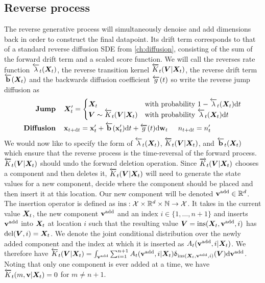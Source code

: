 \subsection{Reverse process}
The reverse generative process will simultaneously denoise and add dimensions back in order to construct the final datapoint. Its drift term corresponds to that of a standard reverse diffusion SDE from \cref{ch:diffusion}, consisting of the sum of the forward drift term and a scaled score function. We will call the reverses rate function $\overleftarrow{\lambda}_t({\bm{X}}_t)$, the reverse transition kernel $\overleftarrow{K}_t({\bm{V}} | {\bm{X}}_t)$, the reverse drift term $\overleftarrow{\mathbf{b}}({\bm{X}}_t)$ and the backwards diffusion coefficient $\overleftarrow{g}(t)$ so write the reverse jump diffusion as
\begin{align}
    \label{eq:tddm-reverse-jump}
    \textbf{Jump} \hspace{.4cm} & {\bm{X}}_t' = \begin{cases}
        {\bm{X}}_t & \text{with probability } 1 - \overleftarrow{\lambda}_t({\bm{X}}_t) \mathrm{d} t \\
        {\bm{V}} \sim \overleftarrow{K}_t( {\bm{V}} |{\bm{X}}_t) & \text{with probability } \overleftarrow{\lambda}_t({\bm{X}}_t) \mathrm{d} t
    \end{cases} 
    \\
    \label{eq:tddm-reverse-diffusion}
    \textbf{Diffusion} \hspace{.4cm} &{\mathbf{x}}_{t+ \mathrm{d} t} = {\mathbf{x}}'_t + \overleftarrow{\mathbf{b}}({\mathbf{x}}'_t)
    \mathrm{d} t + \overleftarrow{g}(t) \mathrm{d} \mathbf{w}_t \hspace{.5cm} n_{t+\mathrm{d} t} = n_t'
\end{align}
We would now like to specify the form of $\overleftarrow{\lambda}_t({\bm{X}}_t)$, $\overleftarrow{K}_t({\bm{V}}|{\bm{X}}_t)$, and $\overleftarrow{\mathbf{b}}_t({\bm{X}}_t)$ which ensure that the reverse process is the time-reversal of the forward process. 
$\overleftarrow{K}_t({\bm{V}} | {\bm{X}}_t)$ should undo the forward deletion operation. Since $\overrightarrow{K}_t({\bm{V}} | {\bm{X}}_t)$ chooses a component and then deletes it, $\overleftarrow{K}_t({\bm{V}} | {\bm{X}}_t)$ will need to generate the state values for a new component, decide where the component should be placed and then insert it at this location. 
Our new component will be denoted ${\mathbf{v}}^{\textup{add}} \in \mathbb{R}^{d}$. 
The insertion operator is defined as $\text{ins}: {\mathcal{X}} \times \mathbb{R}^{d} \times \mathbb{N} \rightarrow {\mathcal{X}}$. It takes in the current value ${\bm{X}}_t$, the new component ${\mathbf{v}}^{\textup{add}}$ and an index $i \in \{1, \dots, n+1\}$ and inserts ${\mathbf{v}}^{\textup{add}}$ into ${\bm{X}}_t$ at location $i$ such that the resulting value ${\bm{V}} = \text{ins}({\bm{X}}_t, {\mathbf{v}}^{\textup{add}}, i)$ has $\text{del}({\bm{V}}, i) = {\bm{X}}_t$.
We denote the joint conditional distribution over the newly added component and the index at which it is inserted as $A_t({\mathbf{v}}^{\textup{add}}, i | {\bm{X}}_t)$.
We therefore have $\overleftarrow{K}_t({\bm{V}} | {\bm{X}}_t) = \int_{{\mathbf{v}}^{\textup{add}}} \sum_{i=1}^{n+1}  A_t({\mathbf{v}}^{\textup{add}}, i | {\bm{X}}_t) \updelta_{\text{ins}({\bm{X}}_t, {\mathbf{v}}^{\textup{add}}, i)}({\bm{V}}) \mathrm{d} {\mathbf{v}}^{\textup{add}}$. Noting that only one component is ever added at a time, we have $\overleftarrow{K}_t(m, {\mathbf{v}} | {\bm{X}}_t) = 0$ for $m \neq n+1$. 

